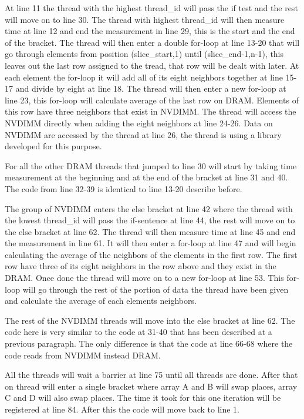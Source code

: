 \documentclass[12pt,a4paper,USenglish]{article}      %
\begin{document}
At line 11 the thread with the highest thread\_id will pass the if test and the rest will move on to line 30. The thread with highest thread\_id will then measure time at line 12 and end the measurement in line 29, this is the start and the end of the bracket. The thread will then enter a double for-loop at line 13-20 that will go through elements from position (slice\_start,1) until (slice\_end-1,n-1), this leaves out the last row assigned to the tread, that row will be dealt with later. At each element the for-loop it will add all of its eight neighbors together at line 15-17 and divide by eight at line 18.
The thread will then enter a new for-loop at line 23, this for-loop will calculate average of the last row on DRAM. Elements of this row have three neighbors that exist in NVDIMM. The thread will access the NVDIMM directly when adding the eight neighbors at line 24-26. Data on NVDIMM are accessed by the thread at line 26, the thread is using a library developed for this purpose. 

For all the other DRAM threads that jumped to line 30 will start by taking time measurement at the beginning and at the end of the bracket at line 31 and 40. The code from line 32-39 is identical to line 13-20 describe before.

The group of NVDIMM enters the else bracket at line 42 where the thread with the lowest thread\_id will pass the if-sentence at line 44, the rest will move on to the else bracket at line 62. The thread will then measure time at line 45 and end the measurement in line 61.
It will then enter a for-loop at line 47 and will begin calculating the average of the neighbors of the elements in the first row. The first row have three of its eight neighbors in the row above and they exist in the DRAM.
Once done the thread will move on to a new for-loop at line 53. This for-loop will go through the rest of the portion of data the thread have been given and calculate the average of each elements neighbors.

The rest of the NVDIMM threads will move into the else bracket at line 62. The code here is very similar to the code at 31-40 that has been described at a previous paragraph. The only difference is that the code at line 66-68 where the code reads from NVDIMM instead DRAM.

All the threads will wait a barrier at line 75 until all threads are done. After that on thread will enter a single bracket where array A and B will swap places, array C and D will also swap places. The time it took for this one iteration will be registered at line 84. After this the code will move back to line 1.
\end{document}
